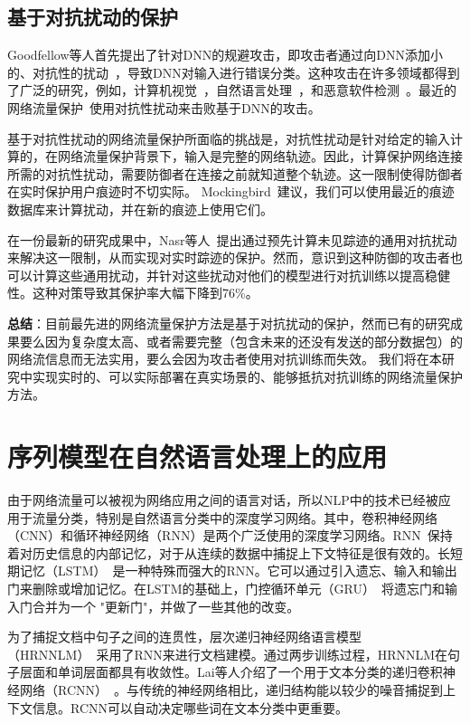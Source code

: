 \documentclass[degree=master,cjk-font=noto]{thuthesis}
\begin{document}
\subsection{基于对抗扰动的保护}

Goodfellow等人首先提出了针对DNN的规避攻击，即攻击者通过向DNN添加小的、对抗性的扰动~\cite{goodfellow2015explaining}，导致DNN对输入进行错误分类。这种攻击在许多领域都得到了广泛的研究，例如，计算机视觉~\cite{7958570,Chen_Sharma_Zhang_Yi_Hsieh_2018}，自然语言处理~\cite{HotFlip,10.1145/3374217}，和恶意软件检测~\cite{10.1007/978-3-319-66399-9_4,8844597}。最近的网络流量保护~\cite{9219593,9265277}使用对抗性扰动来击败基于DNN的攻击。

基于对抗性扰动的网络流量保护所面临的挑战是，对抗性扰动是针对给定的输入计算的，在网络流量保护背景下，输入是完整的网络轨迹。因此，计算保护网络连接所需的对抗性扰动，需要防御者在连接之前就知道整个轨迹。这一限制使得防御者在实时保护用户痕迹时不切实际。
Mockingbird~\cite{9265277}建议，我们可以使用最近的痕迹数据库来计算扰动，并在新的痕迹上使用它们。

在一份最新的研究成果中，Nasr等人~\cite{272174}提出通过预先计算未见踪迹的通用对抗扰动来解决这一限制，从而实现对实时踪迹的保护。然而，意识到这种防御的攻击者也可以计算这些通用扰动，并针对这些扰动对他们的模型进行对抗训练以提高稳健性。这种对策导致其保护率大幅下降到76\%。

\textbf{总结}：目前最先进的网络流量保护方法是基于对抗扰动的保护，然而已有的研究成果要么因为复杂度太高、或者需要完整（包含未来的还没有发送的部分数据包）的网络流信息而无法实用，要么会因为攻击者使用对抗训练而失效。
我们将在本研究中实现实时的、可以实际部署在真实场景的、能够抵抗对抗训练的网络流量保护方法。

\section{序列模型在自然语言处理上的应用}

由于网络流量可以被视为网络应用之间的语言对话，所以NLP中的技术已经被应用于流量分类，特别是自然语言分类中的深度学习网络。其中，卷积神经网络（CNN）和循环神经网络（RNN）是两个广泛使用的深度学习网络。RNN~\cite{RNN}保持着对历史信息的内部记忆，对于从连续的数据中捕捉上下文特征是很有效的。长短期记忆（LSTM）~\cite{LSTM}是一种特殊而强大的RNN。它可以通过引入遗忘、输入和输出门来删除或增加记忆。在LSTM的基础上，门控循环单元（GRU）~\cite{GRU}将遗忘门和输入门合并为一个 "更新门"，并做了一些其他的改变。

为了捕捉文档中句子之间的连贯性，层次递归神经网络语言模型（HRNNLM）~\cite{b28}采用了RNN来进行文档建模。通过两步训练过程，HRNNLM在句子层面和单词层面都具有收敛性。Lai等人介绍了一个用于文本分类的递归卷积神经网络（RCNN）~\cite{b27}。与传统的神经网络相比，递归结构能以较少的噪音捕捉到上下文信息。RCNN可以自动决定哪些词在文本分类中更重要。
\end{document}
